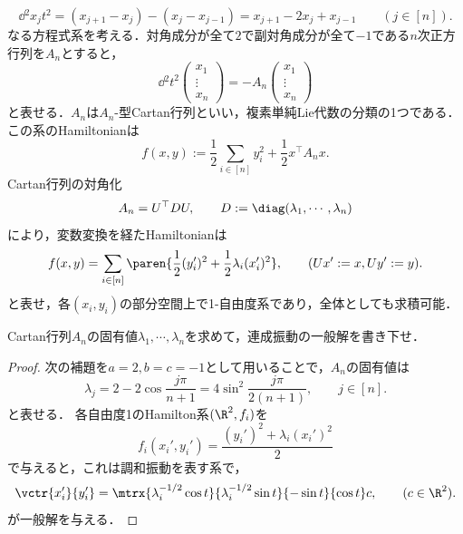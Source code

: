\documentclass[uplatex,dvipdfmx]{jsarticle}
\begin{document}
\begin{exercise}[連成振動の系は多自由度系であるが可積分である]
    \[\dd{^2x_j}{t^2}=(x_{j+1}-x_j)-(x_j-x_{j-1})=x_{j+1}-2x_j+x_{j-1}\qquad(j\in[n]).\]
    なる方程式系を考える．対角成分が全て$2$で副対角成分が全て$-1$である$n$次正方行列を$A_n$とすると，
    \[\dd{^2}{t^2}\begin{pmatrix}x_1\\\vdots\\x_n\end{pmatrix}=-A_n\begin{pmatrix}x_1\\\vdots\\x_n\end{pmatrix}\]
    と表せる．$A_n$は$A_n$-型Cartan行列といい，複素単純Lie代数の分類の1つである．
    この系のHamiltonianは
    \[f(x,y):=\frac{1}{2}\sum_{i\in[n]}y_i^2+\frac{1}{2}x^\top A_nx.\]
    Cartan行列の対角化
    \[A_n=U^\top DU,\qquad D:=\diag(\lambda_1,\cdots,\lambda_n)\]
    により，変数変換を経たHamiltonianは
    \[f(x,y)=\sum_{i\in[n]}\paren{\frac{1}{2}(y'_i)^2+\frac{1}{2}\lambda_i(x_i')^2},\qquad(Ux':=x,Uy':=y).\]
    と表せ，各$(x_i,y_i)$の部分空間上で1-自由度系であり，全体としても求積可能．

    Cartan行列$A_n$の固有値$\lambda_1,\cdots,\lambda_n$を求めて，連成振動の一般解を書き下せ．
\end{exercise}
\begin{proof}
    次の補題を$a=2,b=c=-1$として用いることで，$A_n$の固有値は
    \[\lambda_j=2-2\cos\frac{j\pi}{n+1}=4\sin^2\frac{j\pi}{2(n+1)},\qquad j\in[n].\]
    と表せる．
    各自由度1のHamilton系$(\R^2,f_i)$を
    \[f_i(x_i',y_i')=\frac{(y_i')^2+\lambda_i(x_i')^2}{2}\]
    で与えると，これは調和振動を表す系で，
    \[\vctr{x_i'}{y_i'}=\mtrx{\lambda_i^{-1/2}\cos t}{\lambda_i^{-1/2}\sin t}{-\sin t}{\cos t}c,\qquad(c\in\R^2).\]
    が一般解を与える．
\end{proof}
\end{document}
